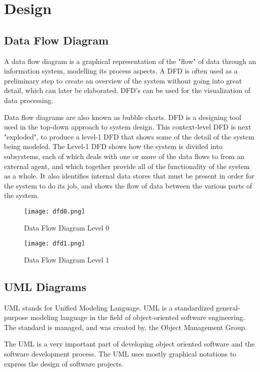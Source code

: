 \chapter{Design}
\section{Data Flow Diagram}
A data flow diagram is a graphical representation of the "flow" of data through an information system, modelling its process aspects. A DFD is often used as a preliminary step to create an overview of the system without going into great detail, which can later be elaborated. DFD's can be used for the visualization of data processing.
\par
Data flow diagrams are also known as bubble charts. DFD is a designing tool used in the top-down approach to system design. This context-level DFD is next "exploded", to produce a level-1 DFD that shows some of the detail of the system being modeled. The Level-1 DFD shows how the system is divided into subsystems, each of which deals with one or more of the data flows to from an external agent, and which together provide all of the functionality of the system as a whole. It also identifies internal data stores that must be present in order for the system to do its job, and shows the flow of data between the various parts of the system.

\begin{center}
\begin{figure}[H]
\centering
\texttt{[image: dfd0.png]}
\caption{Data Flow Diagram Level 0}
\end{figure}
\end{center}

\begin{center}
\begin{figure}[H]
\centering
\texttt{[image: dfd1.png]}
\caption{Data Flow Diagram Level 1}
\end{figure}
\end{center}

\section{UML Diagrams}
UML stands for Unified Modeling Language. UML is a standardized general-purpose modeling language in the field of object-oriented software engineering. The standard is managed, and was created by, the Object Management Group. 
\par
The UML is a very important part of developing object oriented software and the software development process. The UML uses mostly graphical notations to express the design of software projects.\\
